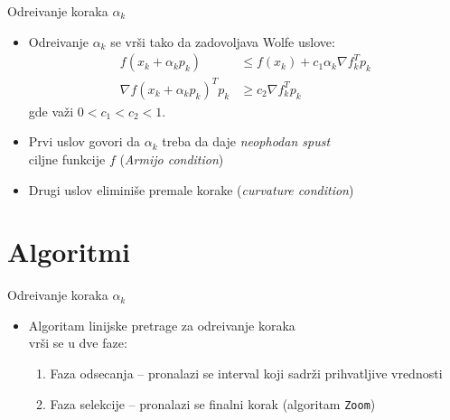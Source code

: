 \documentclass[serbian]{beamer}
\begin{document}
\begin{frame}{Odre\dj ivanje koraka $\alpha_k$}

\begin{itemize}
	\item Odre\dj ivanje $\alpha_k$ se vr\v si tako da zadovoljava Wolfe uslove:
	\begin{equation}\label{for:Wolfe uslovi}
	\begin{aligned}
		f(x_k + \alpha_k p_k) &\leq f(x_k) + c_1 \alpha_k \nabla f_k^T p_k \\
		\nabla f(x_k + \alpha_k p_k)^T p_k &\geq c_2 \nabla f_k^T p_k 
	\end{aligned}
	\end{equation}
	gde va\v zi $0 < c_1 < c_2 < 1$.
	
	\item Prvi uslov govori da $\alpha_k$ treba da daje \emph{neophodan spust} \\ 
	ciljne funkcije $f$ (\emph{Armijo condition})
	
	\item Drugi uslov elimini\v se premale korake (\emph{curvature condition})
\end{itemize}

\end{frame}

\section{Algoritmi}

\begin{frame}{Odre\dj ivanje koraka $\alpha_k$}

\begin{itemize}
	\item Algoritam linijske pretrage za odre\dj ivanje koraka \\
	vr\v si se u dve faze:
	\begin{enumerate}
		\item Faza odsecanja -- pronalazi se interval koji sadr\v zi prihvatljive vrednosti
		\item Faza selekcije -- pronalazi se finalni korak (algoritam \texttt{Zoom})
	\end{enumerate}
\end{itemize}

\end{frame}
\end{document}
